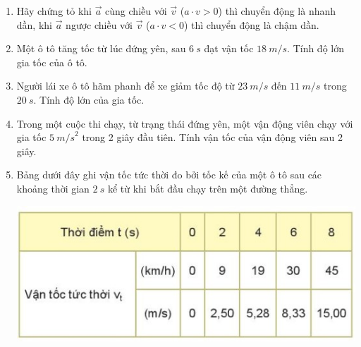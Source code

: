 \begin{enumerate}[label=\bfseries Câu \arabic*:]
	\item {}
	
	{
	Hãy chứng tỏ khi $\vec a$ cùng chiều với $\vec v$ ($a\cdot v>0$) thì chuyển động là nhanh dần, khi $\vec a$ ngược chiều với $\vec v$ ($a\cdot v<0$) thì chuyển động là chậm dần.
	}
	\item {}
	
	{
	Một ô tô tăng tốc từ lúc đứng yên, sau $\SI{6}{s}$ đạt vận tốc $\SI{18}{m/s}$. Tính độ lớn gia tốc của ô tô.
	}
	\item {}
	
	{
	Người lái xe ô tô hãm phanh để xe giảm tốc độ từ $\SI{23}{m/s}$ đến $\SI{11}{m/s}$ trong $\SI{20}{s}$. Tính độ lớn của gia tốc.
	}
		\item {}
	
	{
		Trong một cuộc thi chạy, từ trạng thái đứng yên, một vận động viên chạy với gia tốc $\SI{5}{m/s}^2$ trong 2 giây đầu tiên. Tính vận tốc của vận động viên sau 2 giây.
	}
	\item {}
	
	{
		Bảng dưới đây ghi vận tốc tức thời đo bởi tốc kế của một ô tô sau các khoảng thời gian $\SI{2}{s}$ kể từ khi bắt đầu chạy trên một đường thẳng.
		
		\begin{center}
			\includegraphics[scale=1]{../figs/VN10-2022-PH-TP007-1.jpg}
		\end{center}
	
}
\end{enumerate}
